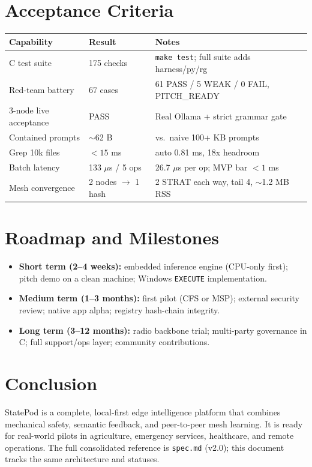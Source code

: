 \documentclass[11pt,a4paper]{article}
\begin{document}
\section{Acceptance Criteria}
\begin{center}
\begin{tabularx}{\textwidth}{l l X}
\toprule
\textbf{Capability} & \textbf{Result} & \textbf{Notes} \\
\midrule
C test suite & 175 checks & \texttt{make test}; full suite adds harness/py/rg \\
Red-team battery & 67 cases & 61 PASS / 5 WEAK / 0 FAIL, PITCH\_READY \\
3-node live acceptance & PASS & Real Ollama + strict grammar gate \\
Contained prompts & $\sim$62 B & vs.\ naive 100+ KB prompts \\
Grep 10k files & $<15$ ms & auto 0.81 ms, 18x headroom \\
Batch latency & 133 $\mu$s / 5 ops & 26.7 $\mu$s per op; MVP bar $<1$ ms \\
Mesh convergence & 2 nodes $\rightarrow$ 1 hash & 2 STRAT each way, tail 4, $\sim$1.2 MB RSS \\
\bottomrule
\end{tabularx}
\end{center}

\section{Roadmap and Milestones}
\begin{itemize}
    \item \textbf{Short term (2--4 weeks):} embedded inference engine (CPU-only first); pitch demo on a clean machine; Windows \texttt{EXECUTE} implementation.
    \item \textbf{Medium term (1--3 months):} first pilot (CFS or MSP); external security review; native app alpha; registry hash-chain integrity.
    \item \textbf{Long term (3--12 months):} radio backbone trial; multi-party governance in C; full support/ops layer; community contributions.
\end{itemize}

\section{Conclusion}
StatePod is a complete, local-first edge intelligence platform that combines mechanical safety, semantic feedback, and peer-to-peer mesh learning. It is ready for real-world pilots in agriculture, emergency services, healthcare, and remote operations. The full consolidated reference is \texttt{spec.md} (v2.0); this document tracks the same architecture and statuses.
\end{document}
